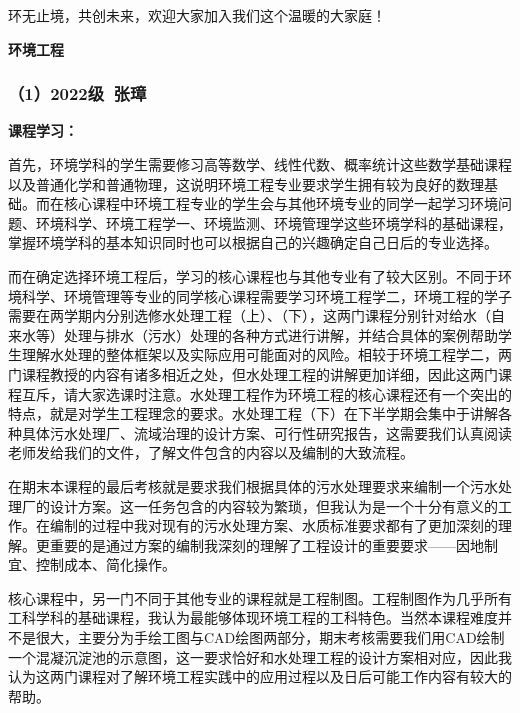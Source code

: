 \vspace{10pt}

环无止境，共创未来，欢迎大家加入我们这个温暖的大家庭！

\vspace{10pt}

\textbf{环境工程}

\subsubsection{（1）2022级\ 张璋}
\textbf{课程学习：}

首先，环境学科的学生需要修习高等数学、线性代数、概率统计这些数学基础课程以及普通化学和普通物理，这说明环境工程专业要求学生拥有较为良好的数理基础。而在核心课程中环境工程专业的学生会与其他环境专业的同学一起学习环境问题、环境科学、环境工程学一、环境监测、环境管理学这些环境学科的基础课程，掌握环境学科的基本知识同时也可以根据自己的兴趣确定自己日后的专业选择。

\vspace{10pt}

而在确定选择环境工程后，学习的核心课程也与其他专业有了较大区别。不同于环境科学、环境管理等专业的同学核心课程需要学习环境工程学二，环境工程的学子需要在两学期内分别选修水处理工程（上）、（下），这两门课程分别针对给水（自来水等）处理与排水（污水）处理的各种方式进行讲解，并结合具体的案例帮助学生理解水处理的整体框架以及实际应用可能面对的风险。相较于环境工程学二，两门课程教授的内容有诸多相近之处，但水处理工程的讲解更加详细，因此这两门课程互斥，请大家选课时注意。水处理工程作为环境工程的核心课程还有一个突出的特点，就是对学生工程理念的要求。水处理工程（下）在下半学期会集中于讲解各种具体污水处理厂、流域治理的设计方案、可行性研究报告，这需要我们认真阅读老师发给我们的文件，了解文件包含的内容以及编制的大致流程。

\vspace{10pt}

在期末本课程的最后考核就是要求我们根据具体的污水处理要求来编制一个污水处理厂的设计方案。这一任务包含的内容较为繁琐，但我认为是一个十分有意义的工作。在编制的过程中我对现有的污水处理方案、水质标准要求都有了更加深刻的理解。更重要的是通过方案的编制我深刻的理解了工程设计的重要要求——因地制宜、控制成本、简化操作。

\vspace{10pt}

核心课程中，另一门不同于其他专业的课程就是工程制图。工程制图作为几乎所有工科学科的基础课程，我认为最能够体现环境工程的工科特色。当然本课程难度并不是很大，主要分为手绘工图与CAD绘图两部分，期末考核需要我们用CAD绘制一个混凝沉淀池的示意图，这一要求恰好和水处理工程的设计方案相对应，因此我认为这两门课程对了解环境工程实践中的应用过程以及日后可能工作内容有较大的帮助。

